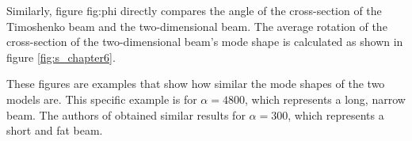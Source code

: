 \documentclass[../../main.tex]{subfiles}
\begin{document}
\begin{figure}[ht!]
\end{figure}
\FloatBarrier

Similarly, figure {fig:phi} directly compares the angle of the cross-section of the Timoshenko beam and the two-dimensional beam. The average rotation of the cross-section of the two-dimensional beam's mode shape is calculated as shown in figure \ref{fig:s_chapter6}.

\FloatBarrier
\begin{figure}[ht!]
\end{figure}
\FloatBarrier

These figures are examples that show how similar the mode shapes of the two models are. This specific example is for $\alpha = 4800$, which represents a long, narrow beam. The authors of \cite{LVV09} obtained similar results for $\alpha=300$, which represents a short and fat beam.
\end{document}
